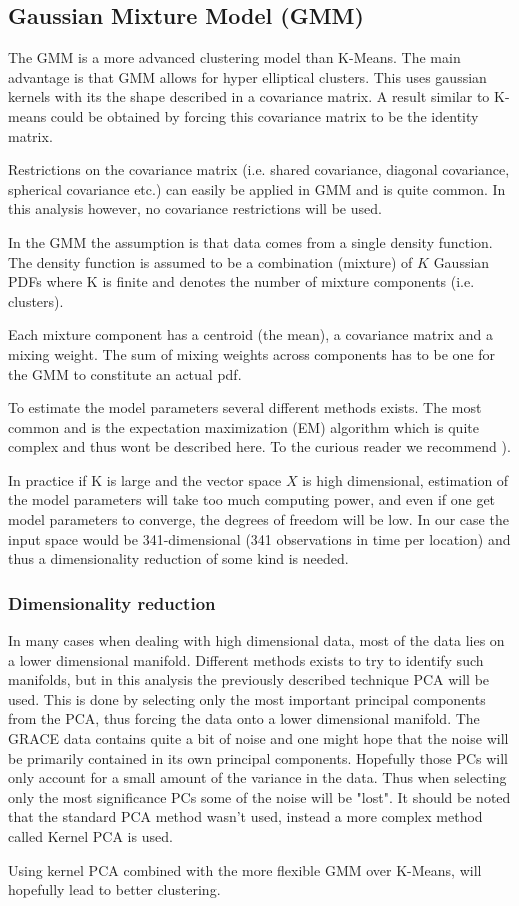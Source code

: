 \subsection{Gaussian Mixture Model (GMM)}
The GMM is a more advanced clustering model than K-Means. 
The main advantage is that GMM allows for hyper elliptical clusters. This uses gaussian kernels with its the shape described in a covariance matrix. A result similar to K-means could be obtained by forcing this covariance matrix to be the identity matrix.

Restrictions on the covariance matrix (i.e. shared covariance, diagonal covariance, spherical covariance etc.) can easily be applied in GMM and is quite common. In this analysis however, no covariance restrictions will be used.

In the GMM the assumption is that data comes from a single density function.
The density function is assumed to be a combination (mixture) of $K$ Gaussian PDFs where K is finite and denotes the number of mixture components (i.e. clusters).

Each mixture component has a centroid (the mean), a covariance matrix and a mixing weight.
The sum of mixing weights across components has to be one for the GMM to constitute an actual pdf.

To estimate the model parameters several different methods exists. The most common and is the expectation maximization (EM) algorithm which is quite complex and thus wont be described here. To the curious reader we recommend \cite[p.~214,272,463]{statistical-learning}).

In practice if K is large and the vector space $X$ is high dimensional, estimation of the model parameters will take too much computing power, and even if one get model parameters to converge, the degrees of freedom will be low.
In our case the input space would be 341-dimensional (341 observations in time per location) and thus a dimensionality reduction of some kind is needed. 

\subsubsection{Dimensionality reduction}
In many cases when dealing with high dimensional data, most of the data lies on a lower dimensional manifold. 
Different methods exists to try to identify such manifolds, but in this analysis the previously described technique PCA will be used.
This is done by selecting only the most important principal components from the PCA, thus forcing the data onto a lower dimensional manifold.
The GRACE data contains quite a bit of noise and one might hope that the noise will be primarily contained in its own principal components. Hopefully those PCs will only account for a small amount of the variance in the data. 
Thus when selecting only the most significance PCs some of the noise will be "lost". It should be noted that the standard PCA method wasn't used, instead a more complex method called Kernel PCA is used.

Using kernel PCA combined with the more flexible GMM over K-Means, will hopefully lead to better clustering.
